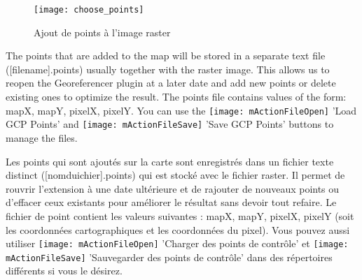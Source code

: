 \begin{figure}[ht]
\centering
  \texttt{[image: choose\_points]}
  \caption{Ajout de points à l'image raster \nixcaption}\label{fig:choose_points}
\end{figure}


The points that are added to the map will be stored in a separate text 
file ([filename].points) usually together with the raster image. 
This allows us to reopen the Georeferencer plugin at a later date and add 
new points or delete existing ones to optimize the result. The points file 
contains values of the form: mapX, mapY, pixelX, pixelY. You can use the 
\texttt{[image: mActionFileOpen]} 'Load GCP Points' and 
\texttt{[image: mActionFileSave]} 'Save GCP Points' buttons to 
manage the files.

Les points qui sont ajoutés sur la carte sont enregistrés dans un fichier texte distinct ([nomduichier].points) qui est stocké avec le fichier raster. Il permet de rouvrir l'extension à une date ultérieure et de rajouter de nouveaux points ou d'effacer ceux existants pour améliorer le résultat sans devoir tout refaire. Le fichier de point contient les valeurs suivantes : mapX, mapY, pixelX, pixelY (soit les coordonnées cartographiques et les coordonnées du pixel). Vous pouvez aussi utiliser \texttt{[image: mActionFileOpen]} 'Charger des points de contrôle' et \texttt{[image: mActionFileSave]} 'Sauvegarder des points de contrôle' dans des répertoires différents si vous le désirez.

\label{georeferencer_transformation}


